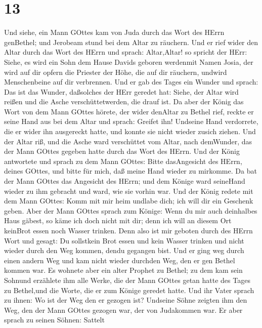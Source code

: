 \hypertarget{section-12}{%
\section{13}\label{section-12}}

 Und siehe, ein Mann GOttes kam von Juda durch das Wort des
HErrn genBethel; und Jerobeam stund bei dem Altar zu räuchern.
 Und er rief wider den Altar durch das Wort des HErrn und
sprach: Altar,Altar! so spricht der HErr: Siehe, es wird ein Sohn dem
Hause Davids geboren werdenmit Namen Josia, der wird auf dir opfern die
Priester der Höhe, die auf dir räuchern, undwird Menschenbeine auf dir
verbrennen.  Und er gab des Tages ein Wunder und sprach: Das
ist das Wunder, daßsolches der HErr geredet hat: Siehe, der Altar wird
reißen und die Asche verschüttetwerden, die drauf ist.  Da
aber der König das Wort von dem Mann GOttes hörete, der wider denAltar
zu Bethel rief, reckte er seine Hand aus bei dem Altar und sprach:
Greifet ihn! Undseine Hand verdorrete, die er wider ihn ausgereckt
hatte, und konnte sie nicht wieder zusich ziehen.  Und der
Altar riß, und die Asche ward verschüttet vom Altar, nach demWunder, das
der Mann GOttes gegeben hatte durch das Wort des HErrn.  Und
der König antwortete und sprach zu dem Mann GOttes: Bitte dasAngesicht
des HErrn, deines GOttes, und bitte für mich, daß meine Hand wieder zu
mirkomme. Da bat der Mann GOttes das Angesicht des HErrn; und dem Könige
ward seineHand wieder zu ihm gebracht und ward, wie sie vorhin war.
 Und der König redete mit dem Mann GOttes: Komm mit mir heim
undlabe dich; ich will dir ein Geschenk geben.  Aber der
Mann GOttes sprach zum Könige: Wenn du mir auch deinhalbes Haus gäbest,
so käme ich doch nicht mit dir; denn ich will an diesem Ort keinBrot
essen noch Wasser trinken.  Denn also ist mir geboten durch
des HErrn Wort und gesagt: Du sollstkein Brot essen und kein Wasser
trinken und nicht wieder durch den Weg kommen, dendu gegangen bist.
 Und er ging weg durch einen andern Weg und kam nicht
wieder durchden Weg, den er gen Bethel kommen war.  Es
wohnete aber ein alter Prophet zu Bethel; zu dem kam sein Sohnund
erzählete ihm alle Werke, die der Mann GOttes getan hatte des Tages zu
Bethel,und die Worte, die er zum Könige geredet hatte.  Und
ihr Vater sprach zu ihnen: Wo ist der Weg den er gezogen ist? Undseine
Söhne zeigten ihm den Weg, den der Mann GOttes gezogen war, der von
Judakommen war.  Er aber sprach zu seinen Söhnen: Sattelt
